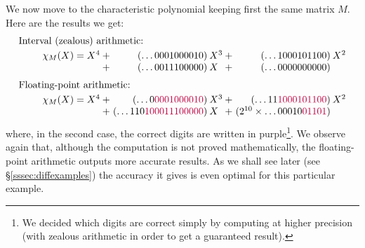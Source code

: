 \documentclass[11pt]{article}
\numberwithin{equation}{section}
\numberwithin{figure}{section}
\theoremstyle{definition}
\begin{document}
We now move to the characteristic polynomial keeping first the same
matrix $M$. Here are the results we get:
$$\begin{array}{cr@{\hspace{0.2ex}}r@{\hspace{0.5ex}}l@{\hspace{0.2ex}}r@{\hspace{0.5ex}}l}
\multicolumn{6}{l}{\text{Interval (zealous) arithmetic:}}\smallskip\\
\hspace{5mm}\null
& \chi_M(X) = X^4 + {}& (\ldots 0001000010) & X^3 
      + {}& (\ldots 1000101100) & X^2 \\
  & {}+ {}& (\ldots 0011100000) & X^{\phantom{1}} 
      + {}& (\ldots 0000000000) \medskip \\
\multicolumn{6}{l}{\text{Floating-point arithmetic:}}\smallskip\\
& \chi_M(X) = X^4 + {}& (\ldots 0{\color{purple}0001000010}) & X^3 
      + {}& (\ldots 11{\color{purple}1000101100}) & X^2 \\
  & {}+ {}& (\ldots 110{\color{purple}100011100000}) & X^{\phantom{1}} 
      + {}& (2^{10} \times \ldots 00010{\color{purple}01101}) \\
\end{array}$$
where, in the second case, the correct digits are written in 
purple\footnote{We decided which digits are correct simply
by computing at higher precision (with zealous arithmetic in order
to get a guaranteed result).}.
We observe again that, although the computation is not proved 
mathematically, the floating-point arithmetic outputs more accurate
results. As we shall see later (see \S \ref{sssec:diffexamples}) 
the accuracy it gives is even optimal for this particular example.
\end{document}
